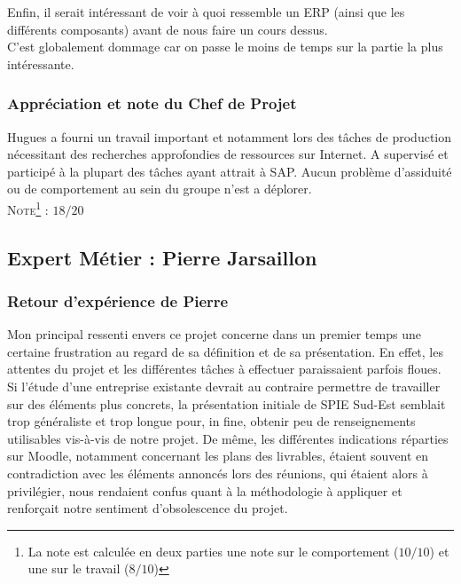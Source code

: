 Enfin,  il serait intéressant de voir à quoi ressemble un ERP (ainsi que les différents composants) avant de nous faire un cours dessus. \\

C’est globalement dommage car on passe le moins de temps sur la partie la plus intéressante.

\subsubsection{Appréciation et note du Chef de Projet}

Hugues a fourni un travail important et notamment lors des tâches de production nécessitant des recherches approfondies de ressources sur Internet. A supervisé et participé à la plupart des tâches ayant attrait à SAP. Aucun problème d’assiduité ou de comportement au sein du groupe n’est a déplorer.\\

\noindent\textsc{Note\footnote{La note est calculée en deux parties une note sur le comportement ($10/10$) et une sur le travail ($8/10$)} :} $18/20$

\subsection{Expert Métier : Pierre Jarsaillon}

\subsubsection{Retour d'expérience de Pierre}

Mon principal ressenti envers ce projet concerne dans un premier temps une certaine frustration au regard de sa définition et de sa présentation. En effet, les attentes du projet et les différentes tâches à effectuer paraissaient parfois floues. Si l’étude d’une entreprise existante devrait au contraire permettre de travailler sur des éléments plus concrets, la présentation initiale de SPIE Sud-Est semblait trop généraliste et trop longue pour, in fine, obtenir peu de renseignements utilisables vis-à-vis de notre projet. De même, les différentes indications réparties sur Moodle, notamment concernant les plans des livrables, étaient souvent en contradiction avec les éléments annoncés lors des réunions, qui étaient alors à privilégier, nous rendaient confus quant à la méthodologie à appliquer et renforçait notre sentiment d’obsolescence du projet. \\
 
